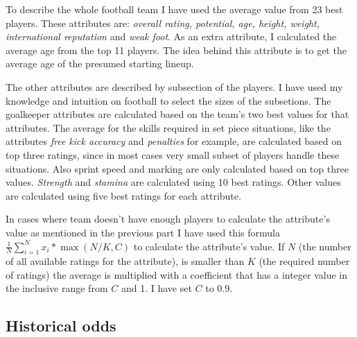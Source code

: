 To describe the whole football team I have used the average value from 23 best players. These attributes are: \textit{overall rating, potential, age, height, weight, international reputation} and \textit{weak foot}. As an extra attribute, I calculated the average age from the top 11 players. The idea behind this attribute is to get the average age of the presumed starting lineup.

The other attributes are described by subsection of the players. I have used my knowledge and intuition on football to select the sizes of the subsetions. The goalkeeper attributes are calculated based on the team's two best values for that attributes. The average for the skills required in set piece situations, like the attributes \textit{free kick accuracy} and \textit{penalties} for example, are calculated based on top three ratings, since in most cases very small subset of players handle these situations. Also sprint speed and marking are only calculated based on top three values. \textit{Strength} and \textit{stamina} are calculated using 10 best ratings. Other values are calculated using five best ratings for each attribute.

In cases where team doesn't have enough players to calculate the attribute's value as mentioned in the previous part I have used this formula $\frac{1}{N}\sum_{i=1}^{N}x_i * \max{(N/K, C)}$ to calculate the attribute's value. If $N$ (the number of all available ratings for the attribute), is smaller than $K$ (the required number of ratings) the average is multiplied with a coefficient that has a integer value in the inclusive range from $C$ and 1. I have set $C$ to 0.9.
\subsection{Historical odds}